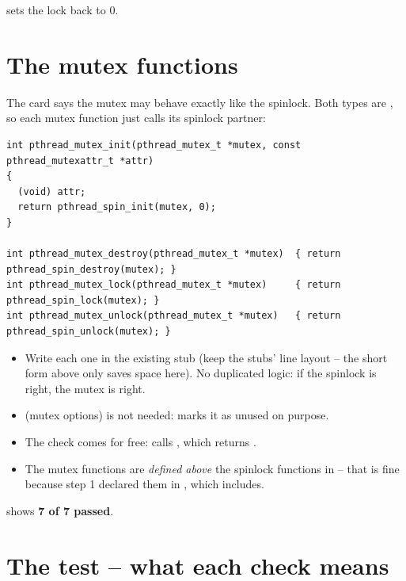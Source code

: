\documentclass[11pt]{report}
\newcommand{\done}[1]{\begin{keybox}[title={Done when}]#1\end{keybox}}
\begin{document}
\done{ sets the lock back to 0.}

\section{The mutex functions \hfill {\normalsize{}}}

The card says the mutex may behave exactly like the spinlock. Both types are , so
each mutex function just calls its spinlock partner:

\begin{lstlisting}
int pthread_mutex_init(pthread_mutex_t *mutex, const pthread_mutexattr_t *attr)
{
  (void) attr;
  return pthread_spin_init(mutex, 0);
}

int pthread_mutex_destroy(pthread_mutex_t *mutex)  { return pthread_spin_destroy(mutex); }
int pthread_mutex_lock(pthread_mutex_t *mutex)     { return pthread_spin_lock(mutex); }
int pthread_mutex_unlock(pthread_mutex_t *mutex)   { return pthread_spin_unlock(mutex); }
\end{lstlisting}

\begin{itemize}
  \item Write each one in the existing stub (keep the stubs' line layout -- the short form above only
        saves space here). No duplicated logic: if the spinlock is right, the mutex is right.
  \item {} (mutex options) is not needed:  marks it as unused on purpose.
  \item The  check comes for free:  calls
        , which returns .
  \item The mutex functions are \emph{defined above} the spinlock functions in  -- that
        is fine because step 1 declared them in , which  includes.
\end{itemize}

\done{ shows \textbf{7 of 7 passed}.}

\section*{The test -- what each check means}
\end{document}
